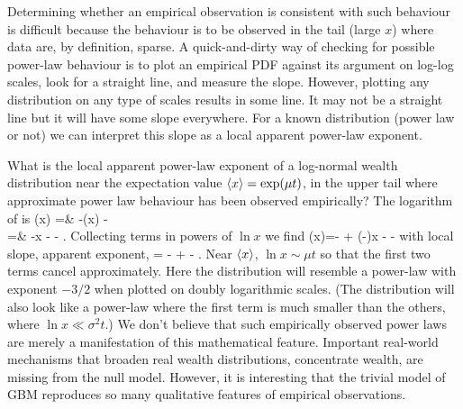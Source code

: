 Determining whether an empirical observation is consistent with such behaviour 
is difficult because the behaviour is to be observed in the tail (large $x$) where data are,
by definition, sparse. A quick-and-dirty way of checking for possible power-law 
behaviour is to plot an empirical PDF against its argument on log-log scales, 
look for a straight line, and measure the slope. However, plotting any distribution on any 
type of scales results in some line. It may not be a straight line but it will have some slope 
everywhere. For a known distribution (power law or not) we can interpret this slope 
as a local apparent power-law exponent. 

What is the local apparent power-law exponent of a log-normal wealth distribution near the 
expectation value $\left\langle x \right\rangle=\exp(\mu t)$, \ie in the upper tail where approximate power law behaviour
has been observed empirically? The logarithm of  is
\bea
\ln \PDF(x) =& -\ln\left(x\right) -\\
=& -\ln x - - .
\eea
Collecting terms in powers of $\ln x$ we find
\be
\ln \PDF(x)=-  + \left(-\right)\ln x - -
\ee
with local slope, \ie apparent exponent,
\be
{} = -   +  - .
\ee
Near $\left\langle x \right\rangle$, $\ln x \sim \mu t$ so that the first two terms cancel approximately. Here the distribution will resemble a power-law with exponent $-3/2$ when plotted on doubly logarithmic scales. (The distribution will also look like a power-law where the first term is much smaller than the others, \eg where $\ln x \ll \sigma^2 t$.) We don't believe that such empirically observed power laws are merely a manifestation of this mathematical feature. Important real-world  mechanisms that broaden real wealth distributions, \ie concentrate wealth, are missing from the null model. However, it is interesting that the trivial model of GBM reproduces so many qualitative features of empirical observations. 


